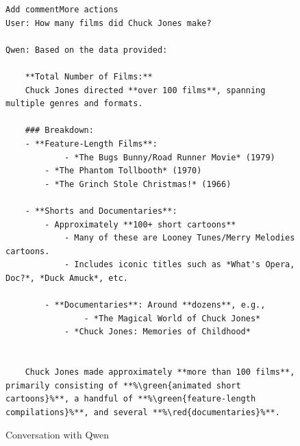 \documentclass[fleqn,moreauthors,10pt]{ds_report}
\newcommand{\red}[1]{\textcolor{red}{#1}}
\newcommand{\green}[1]{\textcolor{green}{#1}}
\begin{document}
\begin{appendix}
\begin{figure}
\begin{tcolorbox}
\begin{lstlisting}[escapechar=\%]Add commentMore actions
User: How many films did Chuck Jones make?

Qwen: Based on the data provided:

	**Total Number of Films:**  
	Chuck Jones directed **over 100 films**, spanning multiple genres and formats.

	### Breakdown:
	- **Feature-Length Films**: 
    		- *The Bugs Bunny/Road Runner Movie* (1979)
	    - *The Phantom Tollbooth* (1970)
	    - *The Grinch Stole Christmas!* (1966)

	- **Shorts and Documentaries**:
	    - Approximately **100+ short cartoons**
	        - Many of these are Looney Tunes/Merry Melodies cartoons.
	        - Includes iconic titles such as *What's Opera, Doc?*, *Duck Amuck*, etc.

	    - **Documentaries**: Around **dozens**, e.g.,
	    	    - *The Magical World of Chuck Jones*
	        - *Chuck Jones: Memories of Childhood*


	Chuck Jones made approximately **more than 100 films**, primarily consisting of **%\green{animated short cartoons}%**, a handful of **%\green{feature-length compilations}%**, and several **%\red{documentaries}%**.
\end{lstlisting}
\end{tcolorbox}
\caption{Conversation with Qwen}
\label{qwenconvo}
\end{figure}


 


\end{appendix}
\end{document}
